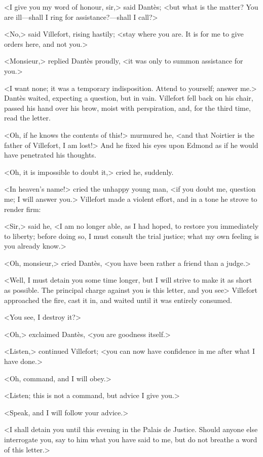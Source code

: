  <I give you my word of honour, sir,> said Dantès; <but what is the matter? You are ill—shall I ring for assistance?—shall I call?> 

 <No,> said Villefort, rising hastily; <stay where you are. It is for me to give orders here, and not you.> 

 <Monsieur,> replied Dantès proudly, <it was only to summon assistance for you.> 

 <I want none; it was a temporary indisposition. Attend to yourself; answer me.> Dantès waited, expecting a question, but in vain. Villefort fell back on his chair, passed his hand over his brow, moist with perspiration, and, for the third time, read the letter. 

 <Oh, if he knows the contents of this!> murmured he, <and that Noirtier is the father of Villefort, I am lost!> And he fixed his eyes upon Edmond as if he would have penetrated his thoughts. 

 <Oh, it is impossible to doubt it,> cried he, suddenly. 

 <In heaven's name!> cried the unhappy young man, <if you doubt me, question me; I will answer you.> Villefort made a violent effort, and in a tone he strove to render firm: 

 <Sir,> said he, <I am no longer able, as I had hoped, to restore you immediately to liberty; before doing so, I must consult the trial justice; what my own feeling is you already know.> 

 <Oh, monsieur,> cried Dantès, <you have been rather a friend than a judge.>

<Well, I must detain you some time longer, but I will strive to make it as short as possible. The principal charge against you is this letter, and you see\longdash> Villefort approached the fire, cast it in, and waited until it was entirely consumed. 

 <You see, I destroy it?> 

 <Oh,> exclaimed Dantès, <you are goodness itself.> 

 <Listen,> continued Villefort; <you can now have confidence in me after what I have done.> 

 <Oh, command, and I will obey.> 

 <Listen; this is not a command, but advice I give you.> 

 <Speak, and I will follow your advice.> 

 <I shall detain you until this evening in the Palais de Justice. Should anyone else interrogate you, say to him what you have said to me, but do not breathe a word of this letter.> 

